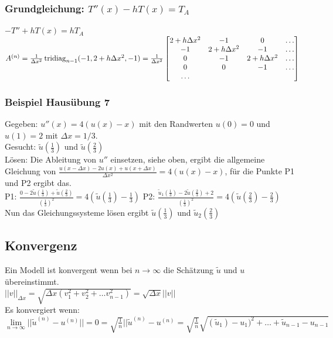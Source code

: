 \subsubsection{Grundgleichung: $T''(x) -  h T(x) = T_A$}
$-T'' + h T(x) = h T_A$\\
$A^{(n)}= \frac{1}{\Delta x^2} \operatorname{tridiag}_{n-1}
(-1,2+h\Delta x^2,-1) = \frac{1}{\Delta x^2}
  \begin{bmatrix}
             2+h\Delta x^2& -1 & 0 & \ldots \\
             -1& 2+h\Delta x^2 & -1 & \ldots \\
              0& -1 & 2+h\Delta x^2 & \ldots \\
              0& 0 & -1 & \ldots \\
             \ldots 
           \end{bmatrix} $\\    
              
\subsubsection{Beispiel Hausübung 7}
Gegeben: $ u''(x)=4(u(x)-x) $ mit den Randwerten $ u(0)=0 $  und $ u(1)=2 $ mit $\Delta x=1/3$.
\\
Gesucht: $ \tilde{u}(\frac{1}{3}) $ und $ \tilde{u}(\frac{2}{3}) $
\\
Lösen: Die Ableitung von $ u'' $ einsetzen, siehe oben, ergibt die allgemeine Gleichung von $ \frac{u(x-\Delta x)-2 u(x) + u(x+ \Delta x)}{\Delta x^2} =4 (u(x)-x) $, für die Punkte P1 und P2 ergibt das.
\\
P1: $ \frac{0-2 \tilde{u}(\frac{1}{3}) + \tilde{u}(\frac{2}{3})}{(\frac{1}{3})^2} =4(\tilde{u}(\frac{1}{3})-\frac{1}{3}) $
\qquad \qquad
P2: $ \frac{\tilde{u}_1(\frac{1}{3})-2 \tilde{u}(\frac{2}{3}) + 2}{(\frac{1}{3})^2} =4(\tilde{u}(\frac{2}{3})-\frac{2}{3}) $
\\
Nun das Gleichungssysteme lösen ergibt $ \tilde{u}(\frac{1}{3}) $ und $ \tilde{u}_2(\frac{2}{3}) $          
           
           
\subsection{Konvergenz}
Ein Modell ist konvergent wenn bei $n\rightarrow\infty$ die Schätzung $\tilde{u}$ und $u$ übereinstimmt.\\

$\boxed{||v||_{\Delta x}=\sqrt{\Delta x (v_1^2+v_2^2 + \ldots v_{n-1}^2)}= \sqrt{\Delta
x}||v||}$\\
Es konvergiert wenn: $\lim\limits_{n\to \infty
}||\tilde{u}^{(n)}-u^{(n)}||=0=\sqrt{\frac{1}{n}}||\tilde{u}^{(n)}-u^{(n)}=\sqrt{\frac{1}{n}}\sqrt{(\tilde{u}_1)-u_1)^2
+ \ldots + \tilde{u}_{n-1}-u_{n-1}}$\\

